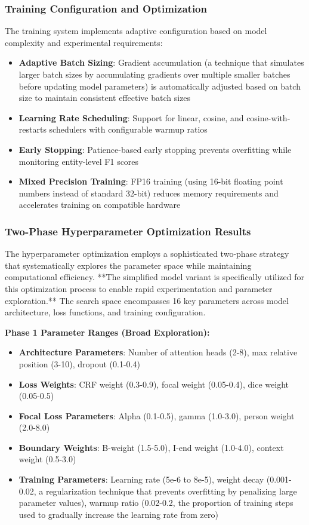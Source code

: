 \documentclass[a4paper]{usiinfbachelorproject}
\begin{document}
\subsubsection{Training Configuration and Optimization}

The training system implements adaptive configuration based on model complexity and experimental requirements:

\begin{itemize}
    \item \textbf{Adaptive Batch Sizing}: Gradient accumulation (a technique that simulates larger batch sizes by accumulating gradients over multiple smaller batches before updating model parameters) is automatically adjusted based on batch size to maintain consistent effective batch sizes
    \item \textbf{Learning Rate Scheduling}: Support for linear, cosine, and cosine-with-restarts schedulers with configurable warmup ratios
    \item \textbf{Early Stopping}: Patience-based early stopping prevents overfitting while monitoring entity-level F1 scores
    \item \textbf{Mixed Precision Training}: FP16 training (using 16-bit floating point numbers instead of standard 32-bit) reduces memory requirements and accelerates training on compatible hardware
\end{itemize}
\subsubsection{Two-Phase Hyperparameter Optimization Results}

The hyperparameter optimization employs a sophisticated two-phase strategy that systematically explores the parameter space while maintaining computational efficiency. **The simplified model variant is specifically utilized for this optimization process to enable rapid experimentation and parameter exploration.** The search space encompasses 16 key parameters across model architecture, loss functions, and training configuration.

\textbf{Phase 1 Parameter Ranges (Broad Exploration):}
\begin{itemize}
    \item \textbf{Architecture Parameters}: Number of attention heads (2-8), max relative position (3-10), dropout (0.1-0.4)
    \item \textbf{Loss Weights}: CRF weight (0.3-0.9), focal weight (0.05-0.4), dice weight (0.05-0.5)
    \item \textbf{Focal Loss Parameters}: Alpha (0.1-0.5), gamma (1.0-3.0), person weight (2.0-8.0)
    \item \textbf{Boundary Weights}: B-weight (1.5-5.0), I-end weight (1.0-4.0), context weight (0.5-3.0)
    \item \textbf{Training Parameters}: Learning rate (5e-6 to 8e-5), weight decay (0.001-0.02, a regularization technique that prevents overfitting by penalizing large parameter values), warmup ratio (0.02-0.2, the proportion of training steps used to gradually increase the learning rate from zero)
\end{itemize}
\end{document}
